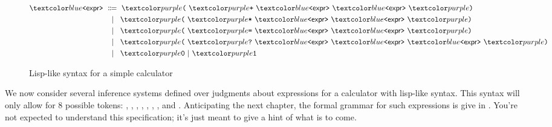 \begin{figure}
\begin{align*}
\bnfnt{expr} &\bnfeq \bnft( \ \bnft+ \ \bnfnt{expr} \ \bnfnt{expr} \ \bnft) \\
&\bnfaltn \bnft( \ \bnft* \ \bnfnt{expr} \ \bnfnt{expr} \ \bnft) \\
&\bnfaltn \bnft( \ \bnft= \ \bnfnt{expr} \ \bnfnt{expr} \ \bnft) \\
&\bnfaltn \bnft( \ \bnft? \ \bnfnt{expr} \ \bnfnt{expr} \ \bnfnt{expr} \ \bnft) \\
&\bnfaltn \bnft 0 \bnfalt \bnft 1
\end{align*}
\caption{Lisp-like syntax for a simple calculator}
\label{fig:calc-syntax}
\end{figure}

We now consider several inference systems defined over judgments about expressions for a calculator with lisp-like syntax.
This syntax will only allow for 8 possible tokens: \codel{(}, \codel{)}, \codel{+}, \codel{*}, \codel{=}, , , and .
Anticipating the next chapter, the formal grammar for such expressions is give in .
You're not expected to understand this specification; it's just meant to give a hint of what is to come.

